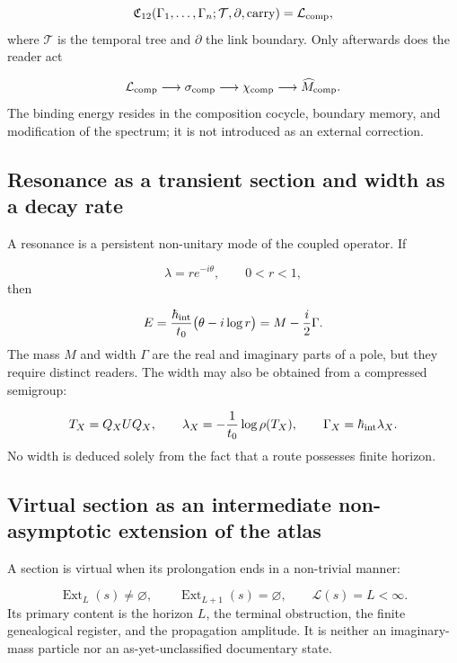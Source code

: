 \[
 \mathfrak C_{12}
 (\Gamma_1,\ldots,\Gamma_n;\mathcal T,\partial,\mathrm{carry})
 =\mathcal L_{\rm comp},
\]
where \(\mathcal T\) is the temporal tree and \(\partial\) the link boundary. Only afterwards does the reader act

\[
 \mathcal L_{\rm comp}\longrightarrow\sigma_{\rm comp}
 \longrightarrow\chi_{\rm comp}
 \longrightarrow\widehat M_{\rm comp}.
\]
The binding energy resides in the composition cocycle, boundary memory, and modification of the spectrum; it is not introduced as an external correction.

\subsection{Resonance as a transient section and width as a decay rate}
A resonance is a persistent non-unitary mode of the coupled operator. If

\[
 \lambda=re^{-i\theta},\qquad 0<r<1,
\]
then

\[
 E=\frac{\hbar_{\rm int}}{t_0}
 \bigl(\theta-i\log r\bigr)
 =M-\frac{i}{2}\Gamma.
\]
The mass \(M\) and width \(\Gamma\) are the real and imaginary parts of a pole, but they require distinct readers. The width may also be obtained from a compressed semigroup:

\[
 T_X=Q_XUQ_X,\qquad
 \lambda_X=-\frac1{t_0}\log\rho(T_X),\qquad
 \Gamma_X=\hbar_{\rm int}\lambda_X.
\]
No width is deduced solely from the fact that a route possesses finite horizon.

\subsection{Virtual section as an intermediate non-asymptotic extension of the atlas}
A section is virtual when its prolongation ends in a non-trivial manner:

\[
 \operatorname{Ext}_{L}(s)\ne\varnothing,\qquad
 \operatorname{Ext}_{L+1}(s)=\varnothing,\qquad
 \mathcal L(s)=L<\infty.
\]
Its primary content is the horizon \(L\), the terminal obstruction, the finite genealogical register, and the propagation amplitude. It is neither an imaginary-mass particle nor an as-yet-unclassified documentary state.

